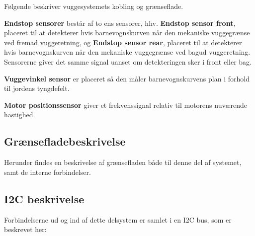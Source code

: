 Følgende beskriver vuggesystemets kobling og grænseflade.


\vspace{5mm} 

\textbf{Endstop sensorer} består af to ens sensorer, hhv. \textbf{Endstop sensor front}, placeret til at detekterer hvis barnevognskurven når den mekaniske vuggegrænse ved fremad vuggeretning, og \textbf{Endstop sensor rear}, placeret til at detekterer hvis barnevognskurven når den mekaniske vuggegrænse ved bagud vuggeretning. Sensorerne giver det samme signal uanset om detekteringen sker i front eller bag.

\vspace{5mm}

\textbf{Vuggevinkel sensor} er placeret så den måler barnevognskurvens plan i forhold til jordens tyngdefelt. 

\vspace{5mm}

\textbf{Motor positionssensor} giver et frekvenssignal relativ til motorens nuværende hastighed. 

\subsection{Grænsefladebeskrivelse}
Herunder findes en beskrivelse af grænsefladen både til denne del af systemet, samt de interne forbindelser. 

\subsection*{I2C beskrivelse}
Forbindelserne ud og ind af dette delsystem er samlet i en I2C bus, som er beskrevet her:

